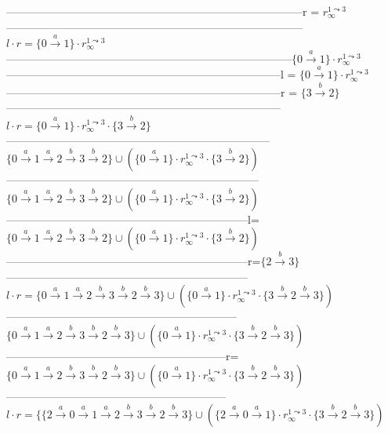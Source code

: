 {---------------------------------------------------------------------------------r = $r_\infty^{1\leadsto 3}$\\
---------------------------------------------------------------------------------$l \cdot r = \{0 \xrightarrow{a} 1\} \cdot r_\infty^{1\leadsto 3}$\\
------------------------------------------------------------------------------$\{0 \xrightarrow{a} 1\} \cdot r_\infty^{1\leadsto 3}$\\
---------------------------------------------------------------------------l =  $\{0 \xrightarrow{a} 1\} \cdot r_\infty^{1\leadsto 3}$\\
---------------------------------------------------------------------------r = $\{3 \xrightarrow{b} 2\}$\\
---------------------------------------------------------------------------$l \cdot r = \{0 \xrightarrow{a} 1\} \cdot r_\infty^{1\leadsto 3} \cdot \{3 \xrightarrow{b} 2\}$\\
------------------------------------------------------------------------$\{0 \xrightarrow{a} 1 \xrightarrow{a} 2 \xrightarrow{b} 3 \xrightarrow{b} 2\} \cup (\{0 \xrightarrow{a} 1\} \cdot r_\infty^{1\leadsto 3} \cdot \{3 \xrightarrow{b} 2\})$\\
---------------------------------------------------------------------$\{0 \xrightarrow{a} 1 \xrightarrow{a} 2 \xrightarrow{b} 3 \xrightarrow{b} 2\} \cup (\{0 \xrightarrow{a} 1\} \cdot r_\infty^{1\leadsto 3} \cdot \{3 \xrightarrow{b} 2\})$\\
------------------------------------------------------------------l=$\{0 \xrightarrow{a} 1 \xrightarrow{a} 2 \xrightarrow{b} 3 \xrightarrow{b} 2\} \cup (\{0 \xrightarrow{a} 1\} \cdot r_\infty^{1\leadsto 3} \cdot \{3 \xrightarrow{b} 2\})$\\
------------------------------------------------------------------r=$\{2 \xrightarrow{b} 3\}$\\
------------------------------------------------------------------$l \cdot r = \{0 \xrightarrow{a} 1 \xrightarrow{a} 2 \xrightarrow{b} 3 \xrightarrow{b} 2 \xrightarrow{b} 3\} \cup (\{0 \xrightarrow{a} 1\} \cdot r_\infty^{1\leadsto 3} \cdot \{3 \xrightarrow{b} 2 \xrightarrow{b} 3\})$\\
---------------------------------------------------------------$\{0 \xrightarrow{a} 1 \xrightarrow{a} 2 \xrightarrow{b} 3 \xrightarrow{b} 2 \xrightarrow{b} 3\} \cup (\{0 \xrightarrow{a} 1\} \cdot r_\infty^{1\leadsto 3} \cdot \{3 \xrightarrow{b} 2 \xrightarrow{b} 3\})$\\
------------------------------------------------------------r=$\{0 \xrightarrow{a} 1 \xrightarrow{a} 2 \xrightarrow{b} 3 \xrightarrow{b} 2 \xrightarrow{b} 3\} \cup (\{0 \xrightarrow{a} 1\} \cdot r_\infty^{1\leadsto 3} \cdot \{3 \xrightarrow{b} 2 \xrightarrow{b} 3\})$\\
------------------------------------------------------------$l \cdot r = \{\{2 \xrightarrow{a} 0 \xrightarrow{a} 1 \xrightarrow{a} 2 \xrightarrow{b} 3 \xrightarrow{b} 2 \xrightarrow{b} 3\} \cup (\{2 \xrightarrow{a} 0 \xrightarrow{a} 1\} \cdot r_\infty^{1\leadsto 3} \cdot \{3 \xrightarrow{b} 2 \xrightarrow{b} 3\})$\\

}
